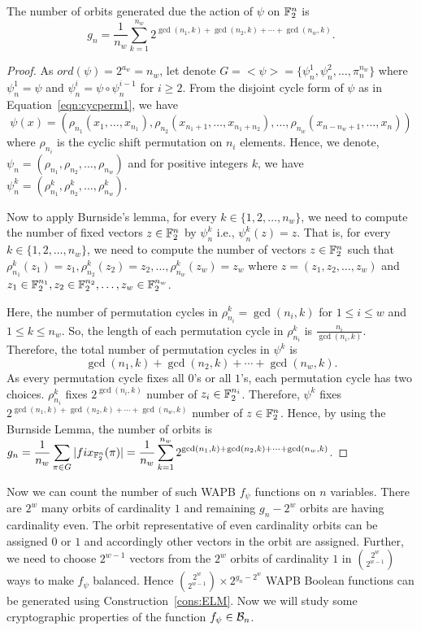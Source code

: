 \documentclass{llncs}
\begin{document}
\begin{theorem}
The number of orbits generated due the action of $\psi$ on $\mathbb{F}_2^n$ is
$$g_n= \frac{1}{n_w} \sum_{k=1}^{n_w}  2^{\gcd(n_1,k)+ \gcd(n_2,k) + \cdots + \gcd(n_w,k)}.$$
\end{theorem}
\begin{proof}
As $ord(\psi) = 2^{a_w} = n_w$, let denote $G = <\psi> = \{\psi_n^1,\psi_n^2, \ldots, \pi_n^{n_w}\}$ where $\psi_n^1 = \psi$ and $\psi_n^i = \psi \circ \psi_n^{i-1}$ for $i \geq 2$. From the disjoint cycle form of $\psi$ as in Equation~\ref{eqn:cycperm1}, we have 
$$\psi(x) = (\rho_{n_1}(x_1,\ldots,x_{n_1}), \rho_{n_2}(x_{n_1+1},\ldots,x_{n_1+n_2}), \ldots, \rho_{n_w}(x_{n-n_w+1},\ldots,x_n))$$
where $\rho_{n_i}$ is the cyclic shift permutation on $n_i$ elements.
Hence, we denote, $\psi_n = (\rho_{n_1},\rho_{n_2},\ldots,\rho_{n_w})$ and for positive integers $k$, we have $\psi_n^k = (\rho_{n_1}^k,\rho_{n_2}^k,\ldots,\rho_{n_w}^k)$.

Now to apply Burnside's lemma, for every $k \in \{1, 2, \ldots, n_w\}$, we need to compute the number of fixed vectors $z \in \mathbb{F}_2^n$ by $\psi_n^k$ i.e., $\psi_n^k(z) = z$. That is, for every $k \in \{1, 2, \ldots, n_w\}$, we need to compute the number of vectors $z \in \mathbb{F}_2^n$ such that $\rho_{n_1}^k(z_1) = z_1, \rho_{n_2}^k(z_2) = z_2, \ldots, \rho_{n_w}^k(z_w) = z_w$ where $z = (z_1,z_2, \ldots, z_w)$ and $z_1 \in \mathbb{F}_2^{n_1}, z_2 \in \mathbb{F}_2^{n_2}, \ldots, z_w \in \mathbb{F}_2^{n_w}$.

Here, the number of permutation cycles in $\rho_{n_i}^k= \gcd(n_i,k)$ for $1 \leq i \leq w$ and $1 \leq k \leq n_w$. So, the length of each permutation cycle in $\rho_{n_i}^k$ is $\frac{n_i}{\gcd(n_i,k)}$. 
Therefore, the total number of permutation cycles in $\psi^k$ is $$\gcd(n_1,k)+ \gcd(n_2,k) + \cdots + \gcd(n_w,k).$$
As every permutation cycle fixes all $0$'s or all $1$'s, each permutation cycle has two choices.
$\rho_{n_i}^k$ fixes $2^{\gcd(n_i,k)}$ number of $z_i \in \mathbb{F}_2^{n_i}$. Therefore, $\psi^k$ fixes $2^{\gcd(n_1,k)+ \gcd(n_2,k) + \cdots + \gcd(n_w,k)}$ number of $z \in \mathbb{F}_2^n$. Hence, by using the Burnside Lemma, the number of orbits is\\
$\displaystyle{g_n = \frac{1}{n_w} \sum_{\pi \in G} |fix_{\mathbb{F}_2^n}(\pi)| 
    = \frac{1}{n_w} \sum_{k=1}^{n_w}  2^{\gcd(n_1,k)+ \gcd(n_2,k) + \cdots + \gcd(n_w,k)}}$.
\end{proof}
Now we can count the number of such WAPB $f_\psi$ functions on $n$ variables. There are $2^w$ many orbits of cardinality $1$ and remaining $g_n - 2^w$ orbits are having cardinality even. The orbit representative of even cardinality orbits can be assigned $0$ or $1$ and accordingly other vectors in the orbit are assigned. Further, we need to choose $2^{w-1}$ vectors from the $2^w$ orbits of cardinality $1$ in $\binom{2^w}{2^{w-1}}$ ways to make $f_\psi$ balanced. Hence $\binom{2^w}{2^{w-1}}\times 2^{g_n - 2^w}$ WAPB Boolean functions can be generated using Construction~\ref{cons:ELM}.
Now we will study some cryptographic properties of the function $f_\psi \in \mathcal{B}_n$. 
\end{document}

